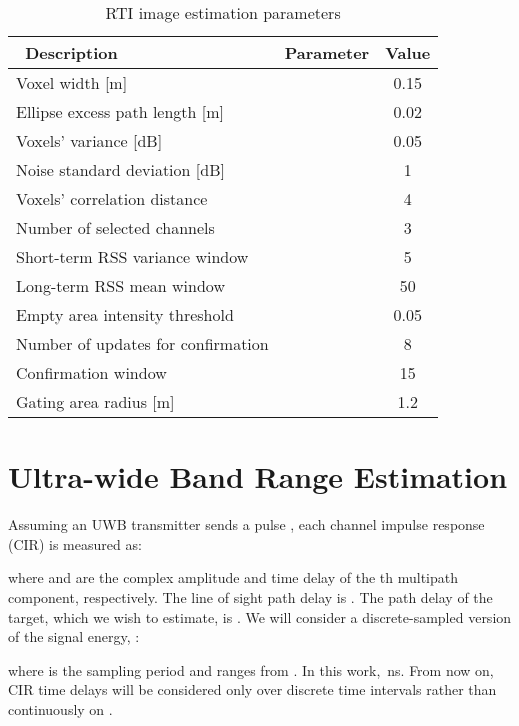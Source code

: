 \documentclass[conference]{IEEEtran}
\begin{document}
\begin{table}[t!]
    \caption{RTI image estimation parameters} \centering
        \footnotesize
        \begin{tabular}{l c c} \hline\hline\          Description & Parameter & Value \\
        \hline  Voxel width [m]                    &           & 0.15 \\
        Ellipse excess path length [m]     &     & 0.02 \\
        Voxels' variance [dB]              &  & 0.05 \\
        Noise standard deviation [dB]      &  & 1 \\
        Voxels' correlation distance       &  & 4 \\
        Number of selected channels        &           & 3 \\
        Short-term RSS variance window     &         & 5 \\
        Long-term RSS mean window          &     & 50 \\
        \hline  Empty area intensity threshold     &         & 0.05 \\
        Number of updates for confirmation &       & 8 \\
        Confirmation window                &           & 15 \\
        Gating area radius [m]             &      & 1.2  \\
        \hline \end{tabular}
        \label{T:RTIImageParameters}
\end{table}



\section{Ultra-wide Band Range Estimation} \label{sec:uwb}

Assuming an UWB transmitter sends a pulse , each channel
impulse response (CIR) is measured as:

where  and  are the complex amplitude and time delay
of the th multipath component, respectively. The line of sight path
delay is . The path delay of the target, which we wish to
estimate, is . We will consider a discrete-sampled version of
the signal energy, :

where  is the sampling period and  ranges from . In
this work, \,ns. From now on, CIR time delays will be considered
only over discrete time intervals  rather than continuously on .
\end{document}
